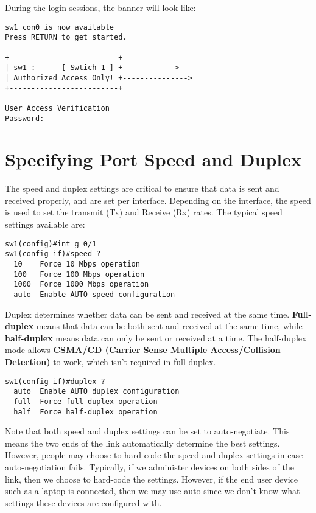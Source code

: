 \noindent
During the login sessions, the banner will look like: 

\vspace{-15pt}
\begin{verbatim}
sw1 con0 is now available
Press RETURN to get started.

+-------------------------+
| sw1 :      [ Swtich 1 ] +------------>
| Authorized Access Only! +--------------->
+-------------------------+

User Access Verification
Password:
\end{verbatim}
\vspace{-10pt}

\section{Specifying Port Speed and Duplex}
The speed and duplex settings are critical to ensure that data is sent and received properly, and are set per interface. Depending on the interface, the speed is used to set the transmit (Tx) and Receive (Rx) rates. The typical speed settings available are: 

\vspace{-15pt}
\begin{verbatim}
sw1(config)#int g 0/1
sw1(config-if)#speed ?
  10    Force 10 Mbps operation
  100   Force 100 Mbps operation
  1000  Force 1000 Mbps operation
  auto  Enable AUTO speed configuration
\end{verbatim}
\vspace{-10pt}

\noindent
Duplex determines whether data can be sent and received at the same time. \textbf{Full-duplex} means that data can be both sent and received at the same time, while \textbf{half-duplex} means data can only be sent or received at a time. The half-duplex mode allows \textbf{CSMA/CD (Carrier Sense Multiple Access/Collision Detection)} to work, which isn't required in full-duplex. 

\vspace{-15pt}
\begin{verbatim}
sw1(config-if)#duplex ?
  auto  Enable AUTO duplex configuration
  full  Force full duplex operation
  half  Force half-duplex operation
\end{verbatim}
\vspace{-10pt}

\noindent
Note that both speed and duplex settings can be set to auto-negotiate. This means the two ends of the link automatically determine the best settings. However, people may choose to hard-code the speed and duplex settings in case auto-negotiation fails. Typically, if we administer devices on both sides of the link, then we choose to hard-code the settings. However, if the end user device such as a laptop is connected, then we may use auto since we don't know what settings these devices are configured with. 

